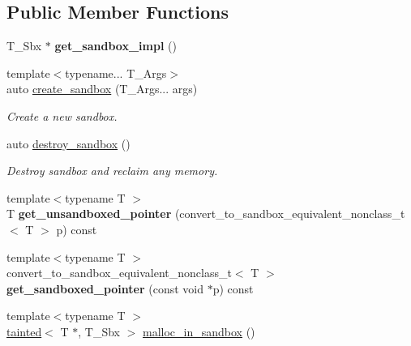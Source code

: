 \subsection*{Public Member Functions}
\begin{DoxyCompactItemize}
\item 
\mbox{\label{classrlbox_1_1rlbox__sandbox_a32de91755a582024dc43b879ef192b2c}} 
T\+\_\+\+Sbx $\ast$ {\bfseries get\+\_\+sandbox\+\_\+impl} ()
\item 
{\footnotesize template$<$typename... T\+\_\+\+Args$>$ }\\auto \hyperlink{classrlbox_1_1rlbox__sandbox_a7b938866462f607bcc069770c1bc1ba6}{create\+\_\+sandbox} (T\+\_\+\+Args... args)
\begin{DoxyCompactList}\small\item\em Create a new sandbox. \end{DoxyCompactList}\item 
\mbox{\label{classrlbox_1_1rlbox__sandbox_ac2be161ed2183fa8bc319232a8d74da6}} 
auto \hyperlink{classrlbox_1_1rlbox__sandbox_ac2be161ed2183fa8bc319232a8d74da6}{destroy\+\_\+sandbox} ()
\begin{DoxyCompactList}\small\item\em Destroy sandbox and reclaim any memory. \end{DoxyCompactList}\item 
\mbox{\label{classrlbox_1_1rlbox__sandbox_a4776bcab38dc24395657d2c437e36fc8}} 
{\footnotesize template$<$typename T $>$ }\\T {\bfseries get\+\_\+unsandboxed\+\_\+pointer} (convert\+\_\+to\+\_\+sandbox\+\_\+equivalent\+\_\+nonclass\+\_\+t$<$ T $>$ p) const
\item 
\mbox{\label{classrlbox_1_1rlbox__sandbox_aaef51e55536f08aa4c642f21d0de8008}} 
{\footnotesize template$<$typename T $>$ }\\convert\+\_\+to\+\_\+sandbox\+\_\+equivalent\+\_\+nonclass\+\_\+t$<$ T $>$ {\bfseries get\+\_\+sandboxed\+\_\+pointer} (const void $\ast$p) const
\item 
{\footnotesize template$<$typename T $>$ }\\\hyperlink{classrlbox_1_1tainted}{tainted}$<$ T $\ast$, T\+\_\+\+Sbx $>$ \hyperlink{classrlbox_1_1rlbox__sandbox_ab6ecbc8d0d69a3305912fe92882ef6b9}{malloc\+\_\+in\+\_\+sandbox} ()

\end{DoxyCompactItemize}
